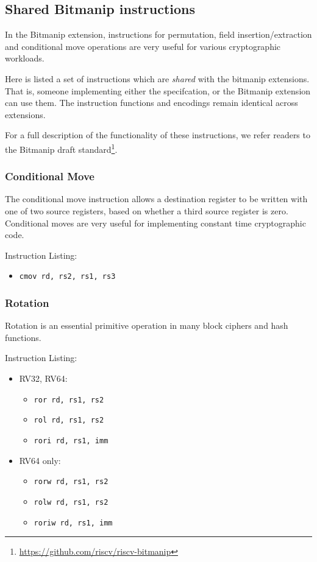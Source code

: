 \subsection{Shared Bitmanip instructions}
\label{sec:spec:shared:bitmanip}

In the Bitmanip extension, instructions for permutation, field
insertion/extraction and conditional move operations are very
useful for various cryptographic workloads.

Here is listed a set of instructions which are {\em shared} with
the bitmanip extensions.
That is, someone implementing either the \XCID specifcation, or
the Bitmanip extension can use them.
The instruction functions and encodings remain identical across extensions.

For a full description of the functionality of these instructions, we
refer readers to the Bitmanip draft standard\footnote{
\url{https://github.com/riscv/riscv-bitmanip}
}.

\subsubsection{Conditional Move}
The conditional move instruction allows a destination register to
be written with one of two source registers, based on whether a
third source register is zero.
Conditional moves are very useful for implementing constant time
cryptographic code.

Instruction Listing:
\begin{itemize}
\item {\tt cmov rd, rs2, rs1, rs3}
\end{itemize}

\subsubsection{Rotation}
Rotation is an essential primitive operation in many block ciphers and
hash functions.

Instruction Listing:
\begin{itemize}
\item RV32, RV64:
\begin{itemize}
\item {\tt ror  rd, rs1, rs2}
\item {\tt rol  rd, rs1, rs2}
\item {\tt rori rd, rs1, imm}
\end{itemize}
\item RV64 only:
\begin{itemize}
\item {\tt rorw  rd, rs1, rs2}
\item {\tt rolw  rd, rs1, rs2}
\item {\tt roriw rd, rs1, imm}
\end{itemize}
\end{itemize}

